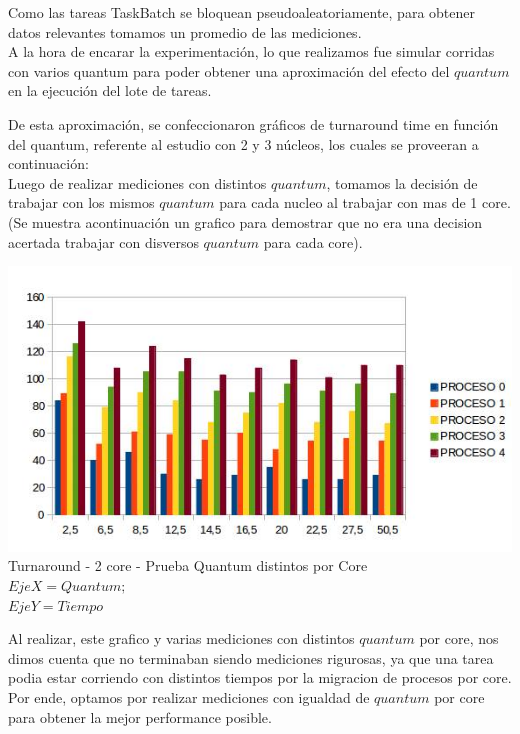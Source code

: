 \indent \indent Como las tareas TaskBatch se bloquean pseudoaleatoriamente, 
para obtener datos relevantes tomamos un promedio de las mediciones.\\
\indent A la hora de encarar la experimentación, lo que realizamos fue simular corridas con 
varios quantum para poder obtener una aproximación del efecto del $quantum$ en la ejecución del lote de tareas. 

\indent De esta aproximación, se confeccionaron gráficos de turnaround time en función del quantum, 
referente al estudio con 2 y 3 núcleos, los cuales se proveeran a continuación:\\

\indent Luego de realizar mediciones con distintos $quantum$, tomamos la decisión de trabajar con los mismos $quantum$ para cada nucleo
al trabajar con mas de 1 core. (Se muestra acontinuación un grafico para demostrar que no era una decision acertada trabajar
con disversos $quantum$ para cada core).

\begin{center}
    	\includegraphics[width=1\textwidth]{./EJ7/turnarounddistquan.png}
	{Turnaround - 2 core - Prueba Quantum distintos por Core}\\
	{$Eje X = Quantum; $\\$ Eje Y = Tiempo$}\\
 \end{center}

\indent Al realizar, este grafico y varias mediciones con distintos $quantum$ por core, nos dimos cuenta que no terminaban
siendo mediciones rigurosas, ya que una tarea podia estar corriendo con distintos tiempos por la migracion de procesos por core.\\
\indent Por ende, optamos por realizar mediciones con igualdad de $quantum$ por core para obtener la mejor performance posible.\\
 
